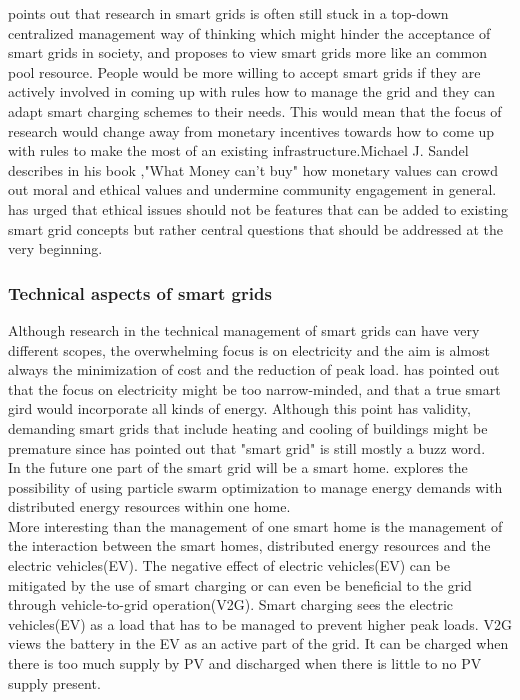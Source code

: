 \documentclass[a4paper]{article}
\begin{document}
\cite{smartcpr} points out that research in smart grids is often still stuck in a top-down centralized management way of thinking which 
might hinder the acceptance of smart grids in society, and proposes to view smart grids more like an common pool resource. People would be more willing to accept smart grids if 
they are actively involved in coming up with rules how to manage the grid and they can adapt smart charging schemes  to their needs. 
This would mean that the focus of research would change away from monetary incentives towards how to come up with rules to make the most of an existing infrastructure.Michael J. Sandel describes in his book ,"What Money can't buy" how monetary values can crowd out moral and ethical values and undermine community engagement in general. \cite{ethics2} has urged that ethical issues should not be features that can be added to existing smart grid concepts but rather central questions that should be addressed at the very beginning.
 \\
 \subsubsection{Technical aspects of smart grids}
Although research in the technical management of smart grids can have very different scopes, the overwhelming focus is on electricity and the aim is almost always the minimization of cost 
and the reduction of peak load. \cite{smartenergy} has pointed out that the focus on electricity might be too narrow-minded, and that a true smart gird would incorporate all kinds 
of energy. Although this point has validity, demanding smart grids that include heating and cooling of buildings might be premature since \cite{smartcpr} has pointed 
out that "smart grid" is still mostly a buzz word. \\
In the future one part of the smart grid will be a smart home. \cite{smarthome} explores the possibility of using particle swarm optimization to manage energy demands with 
distributed energy resources within one home.\\
More interesting than the management of one smart home is the management of the interaction between the smart homes, distributed energy resources and the electric vehicles(EV). 
The negative effect of electric vehicles(EV) can be mitigated by the use of smart charging or can even be beneficial to the grid through vehicle-to-grid operation(V2G). Smart charging sees 
the electric vehicles(EV) as a load that has to be managed to prevent higher peak loads. V2G views the battery in the EV as an active part of the grid. It can be charged when there 
is too much supply by PV and discharged when there is little to no PV supply present\cite{v2g}.\\
\end{document}
